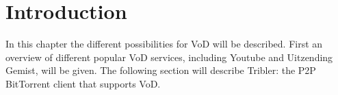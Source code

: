 \section{Introduction}
In this chapter the different possibilities for VoD will be described. First an overview of different popular VoD services, including Youtube and Uitzending Gemist, will be given. The following section will describe Tribler: the P2P BitTorrent client that supports VoD. 